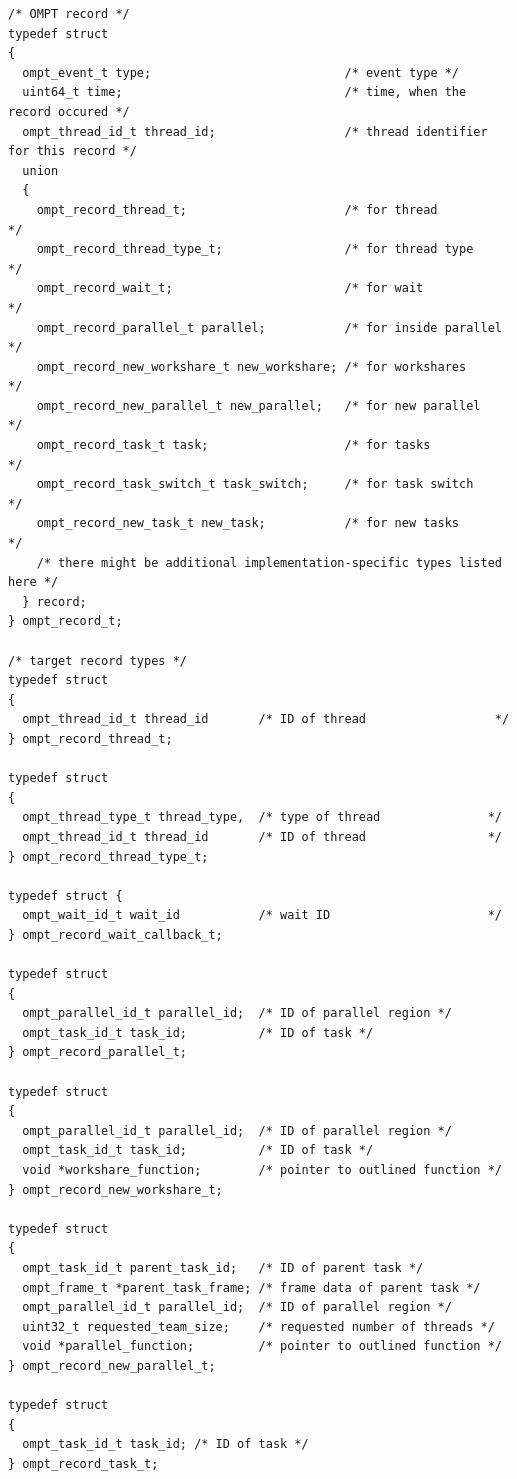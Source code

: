 \documentclass{article}
\begin{document}
\begin{verbatim}
/* OMPT record */
typedef struct
{
  ompt_event_t type;                           /* event type */
  uint64_t time;                               /* time, when the record occured */
  ompt_thread_id_t thread_id;                  /* thread identifier for this record */
  union
  {
    ompt_record_thread_t;                      /* for thread          */
    ompt_record_thread_type_t;                 /* for thread type     */
    ompt_record_wait_t;                        /* for wait            */
    ompt_record_parallel_t parallel;           /* for inside parallel */
    ompt_record_new_workshare_t new_workshare; /* for workshares      */
    ompt_record_new_parallel_t new_parallel;   /* for new parallel    */
    ompt_record_task_t task;                   /* for tasks           */
    ompt_record_task_switch_t task_switch;     /* for task switch     */
    ompt_record_new_task_t new_task;           /* for new tasks       */
    /* there might be additional implementation-specific types listed here */
  } record;
} ompt_record_t;

/* target record types */
typedef struct
{
  ompt_thread_id_t thread_id       /* ID of thread                  */
} ompt_record_thread_t;

typedef struct
{
  ompt_thread_type_t thread_type,  /* type of thread               */
  ompt_thread_id_t thread_id       /* ID of thread                 */
} ompt_record_thread_type_t;

typedef struct {
  ompt_wait_id_t wait_id           /* wait ID                      */
} ompt_record_wait_callback_t;

typedef struct
{
  ompt_parallel_id_t parallel_id;  /* ID of parallel region */
  ompt_task_id_t task_id;          /* ID of task */
} ompt_record_parallel_t;

typedef struct
{
  ompt_parallel_id_t parallel_id;  /* ID of parallel region */
  ompt_task_id_t task_id;          /* ID of task */
  void *workshare_function;        /* pointer to outlined function */
} ompt_record_new_workshare_t;

typedef struct
{
  ompt_task_id_t parent_task_id;   /* ID of parent task */
  ompt_frame_t *parent_task_frame; /* frame data of parent task */
  ompt_parallel_id_t parallel_id;  /* ID of parallel region */
  uint32_t requested_team_size;    /* requested number of threads */
  void *parallel_function;         /* pointer to outlined function */
} ompt_record_new_parallel_t;

typedef struct
{
  ompt_task_id_t task_id; /* ID of task */
} ompt_record_task_t;


\end{verbatim}
\end{document}

